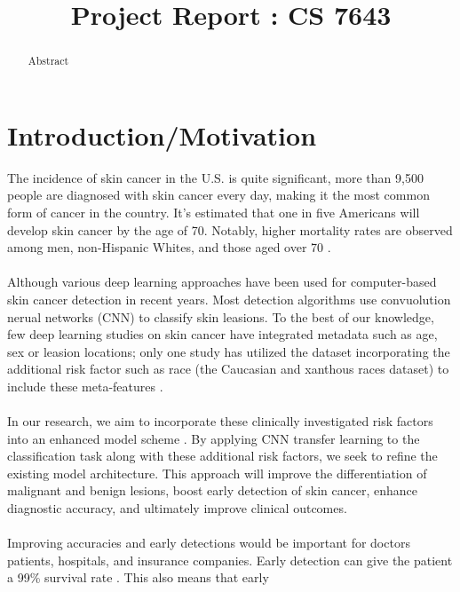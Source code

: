 \documentclass[10pt,twocolumn,letterpaper]{article}
\begin{document}
    \title{Project Report : CS 7643}

    \maketitle

    \begin{abstract}
        Abstract
    \end{abstract}

    \section{Introduction/Motivation}
    The incidence of skin cancer in the U.S. is quite significant, more than 
    9,500 people are diagnosed with skin cancer every day, making it the most 
    common form of cancer in the country. It's estimated that one in five 
    Americans will develop skin cancer by the age of 70. Notably, higher 
    mortality rates are observed among men, non-Hispanic Whites, and those 
    aged over 70 \cite{Authors1}. \\
    \\
    Although various deep learning approaches have been used for 
    computer-based skin cancer detection in recent years. Most detection
    algorithms use convuolution nerual networks (CNN) to
    classify skin leasions.  To the best of our knowledge, few deep learning 
    studies on skin cancer have integrated metadata such as age, sex or leasion locations; 
    only one study has utilized the dataset incorporating the additional risk 
    factor such as race (the Caucasian and xanthous races dataset) to include these 
    meta-features \cite{Authors2, Authors3, Authors4}.\\
    \\
    In our research, we aim to incorporate these clinically investigated 
    risk factors into an enhanced model scheme \cite{Authors5}. By applying CNN transfer 
    learning to the classification task along with these additional risk 
    factors, we seek to refine the existing model architecture. This approach will improve the differentiation of malignant and 
    benign lesions, boost early detection of skin cancer, enhance diagnostic 
    accuracy, and ultimately improve clinical outcomes. \\
    \\
    Improving accuracies and early detections would be important for doctors
    patients, hospitals, and insurance companies.  Early detection can give the
    patient a 99\% survival rate \cite{Authors6}.  This also means that early
\end{document}
